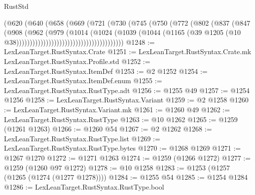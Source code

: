 \begin{lexlean}{RustStd}
\begin{coremodule}
                                        (@620
                                          (@640
                                            (@658
                                              (@669
                                                (@721
                                                  (@730
                                                    (@745
                                                      (@750
                                                        (@772
                                                          (@802
                                                            (@837
                                                              (@847
                                                                (@908
                                                                  (@962
                                                                    (@979
                                                                      (@1014
                                                                        (@1024
                                                                          (@1039
                                                                            (@1044
                                                                              (@1165
                                                                                (@39
                                                                                  @1205
                                                                                  (@10
                                                                                    @38))))))))))))))))))))))))))))))))))))))))
@1248 := LexLeanTarget.RustSyntax.Crate
@1251 := LexLeanTarget.RustSyntax.Crate.mk LexLeanTarget.RustSyntax.Profile.std
@1252 := LexLeanTarget.RustSyntax.ItemDef
@1253 := @2 @1252
@1254 := LexLeanTarget.RustSyntax.ItemDef.enum
@1255 := LexLeanTarget.RustSyntax.RustType.adt
@1256 := @1255 @49
@1257 := @1254 @1256
@1258 := LexLeanTarget.RustSyntax.Variant
@1259 := @2 @1258
@1260 := LexLeanTarget.RustSyntax.Variant.mk
@1261 := @1260 @49
@1262 := LexLeanTarget.RustSyntax.RustType
@1263 := @10 @1262
@1265 := @1259 (@1261 @1263)
@1266 := @1260 @54
@1267 := @2 @1262
@1268 := LexLeanTarget.RustSyntax.RustType.list
@1269 := LexLeanTarget.RustSyntax.RustType.bytes
@1270 := @1268 @1269
@1271 := @1267 @1270
@1272 := @1271 @1263
@1274 := @1259 (@1266 @1272)
@1277 := @1259 (@1260 @97 @1272)
@1278 := @10 @1258
@1283 := @1253 (@1257 (@1265 (@1274 (@1277 @1278))))
@1284 := @1255 @54
@1285 := @1254 @1284
@1286 := LexLeanTarget.RustSyntax.RustType.bool

\end{coremodule}
\end{lexlean}
